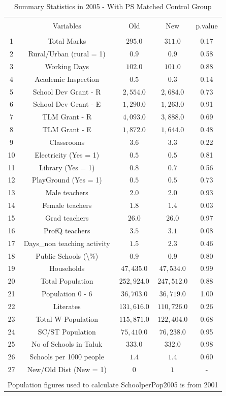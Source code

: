 \documentclass[12pt, a4paper]{article}
\begin{document}
\begin{table}[!htbp] \centering 
  \caption{Summary Statistics in 2005 - With PS Matched Control Group} 
  \label{} 
\begin{tabular}{@{\extracolsep{5pt}} ccccc} 
\\[-1.8ex]\hline 
\hline \\[-1.8ex] 
 & Variables & Old & New & p.value \\ 
\hline \\[-1.8ex] 
1 & Total Marks & $295.0$ & $311.0$ & 0.17 \\ 
2 & Rural/Urban (rural = 1) & $0.9$ & $0.9$ & 0.58 \\ 
3 & Working Days & $102.0$ & $101.0$ & 0.88 \\ 
4 & Academic Inspection & $0.5$ & $0.3$ & 0.14 \\ 
5 & School Dev Grant - R & $2,554.0$ & $2,684.0$ & 0.73 \\ 
6 & School Dev Grant - E & $1,290.0$ & $1,263.0$ & 0.91 \\ 
7 & TLM Grant - R & $4,093.0$ & $3,888.0$ & 0.69 \\ 
8 & TLM Grant - E & $1,872.0$ & $1,644.0$ & 0.48 \\ 
9 & Classrooms & $3.6$ & $3.3$ & 0.22 \\ 
10 & Electricity (Yes = 1) & $0.5$ & $0.5$ & 0.81 \\ 
11 & Library  (Yes = 1) & $0.8$ & $0.7$ & 0.56 \\ 
12 & PlayGround  (Yes = 1) & $0.5$ & $0.5$ & 0.73 \\ 
13 & Male teachers & $2.0$ & $2.0$ & 0.93 \\ 
14 & Female teachers & $1.8$ & $1.4$ & 0.03 \\ 
15 & Grad teachers & $26.0$ & $26.0$ & 0.97 \\ 
16 & ProfQ teachers & $3.5$ & $3.1$ & 0.08 \\ 
17 & Days\_non teaching activity & $1.5$ & $2.3$ & 0.46 \\ 
18 & Public Schools (\textbackslash \%) & $0.9$ & $0.9$ & 0.80 \\ 
19 & Households & $47,435.0$ & $47,534.0$ & 0.99 \\ 
20 & Total Population & $252,924.0$ & $247,512.0$ & 0.88 \\ 
21 & Population 0 - 6 & $36,703.0$ & $36,719.0$ & 1.00 \\ 
22 & Literates & $131,616.0$ & $110,726.0$ & 0.26 \\ 
23 & Total W Population & $115,871.0$ & $122,404.0$ & 0.68 \\ 
24 & SC/ST Population & $75,410.0$ & $76,238.0$ & 0.95 \\ 
25 & No of Schools in Taluk & $333.0$ & $332.0$ & 0.98 \\ 
26 & Schools per 1000 people & $1.4$ & $1.4$ & 0.60 \\ 
27 & New/Old Dist (New = 1) & $0$ & $1$ & - \\ 
\hline \\[-1.8ex] 
\multicolumn{5}{l}{Population figures used to calculate SchoolperPop2005 is from 2001} \\ 
\end{tabular} 
\end{table} 
\end{document}
